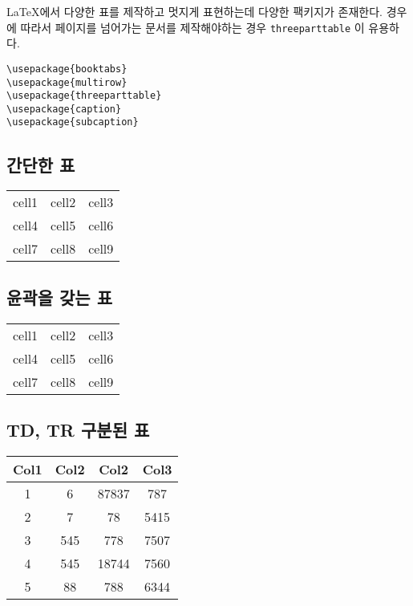 
\LaTeX 에서 다양한 표를 제작하고 멋지게 표현하는데 다양한 팩키지가 존재한다. 
경우에 따라서 페이지를 넘어가는 문서를 제작해야하는 경우 \verb*|threeparttable| 이 유용하다.

\begin{verbatim}
\usepackage{booktabs}
\usepackage{multirow}
\usepackage{threeparttable}
\usepackage{caption}
\usepackage{subcaption}
\end{verbatim}


\subsection{간단한 표}

\begin{center}
	\begin{tabular}{ c c c }
		cell1 & cell2 & cell3 \\ 
		cell4 & cell5 & cell6 \\  
		cell7 & cell8 & cell9    
	\end{tabular}
\end{center}

\subsection{윤곽을 갖는 표}

\begin{center}
	\begin{tabular}{ |c|c|c| } 
		\hline
		cell1 & cell2 & cell3 \\ 
		cell4 & cell5 & cell6 \\ 
		cell7 & cell8 & cell9 \\ 
		\hline
	\end{tabular}
\end{center}

\subsection{TD, TR 구분된 표}

\begin{center}
	\begin{tabular}{||c c c c||} 
		\hline
		Col1 & Col2 & Col2 & Col3 \\ [0.5ex] 
		\hline\hline
		1 & 6 & 87837 & 787 \\ 
		\hline
		2 & 7 & 78 & 5415 \\
		\hline
		3 & 545 & 778 & 7507 \\
		\hline
		4 & 545 & 18744 & 7560 \\
		\hline
		5 & 88 & 788 & 6344 \\ [1ex] 
		\hline
	\end{tabular}
\end{center}

